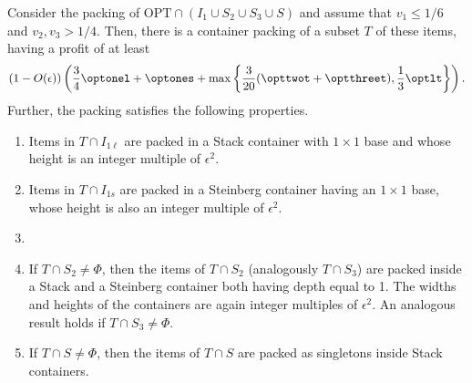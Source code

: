 \begin{theorem}
    Consider the packing of $\text{OPT}\cap \left(I_1\cup S_2\cup S_3\cup S\right)$ and assume that $v_1\le 1/6$ and $v_2,v_3>1/4$. Then, there is a container packing of a subset $T$ of these items, having a profit of at least 
    \[ (1-O(\epsilon))\left(\frac{3}{4}\optonel+\optones+\max\left\{\frac{3}{20}(\opttwot+\optthreet),\frac{1}{3}\optlt\right\}\right). \] 
    Further, the packing satisfies the following properties.
    \begin{enumerate}
        \item Items in $T\cap I_{1\ell}$ are packed in a Stack container with $1\times 1$ base and whose height is an integer multiple of $\epsilon^2$.
        \item Items in $T\cap I_{1s}$ are packed in a Steinberg container having an $1\times 1$ base, whose height is also an integer multiple of $\epsilon^2$.
        \item {}    
        \item If $T\cap S_2 \neq \Phi$, then the items of $T\cap S_2$ (analogously $T\cap S_3$) are packed inside a Stack and a Steinberg container both having depth equal to 1. The widths and heights of the containers are again integer multiples of $\epsilon^2$. An analogous result holds if $T\cap S_3 \neq \Phi$.
        \item If $T\cap S \neq \Phi$, then the items of $T\cap S$ are packed as singletons inside Stack containers.
    \end{enumerate}
\end{theorem}

